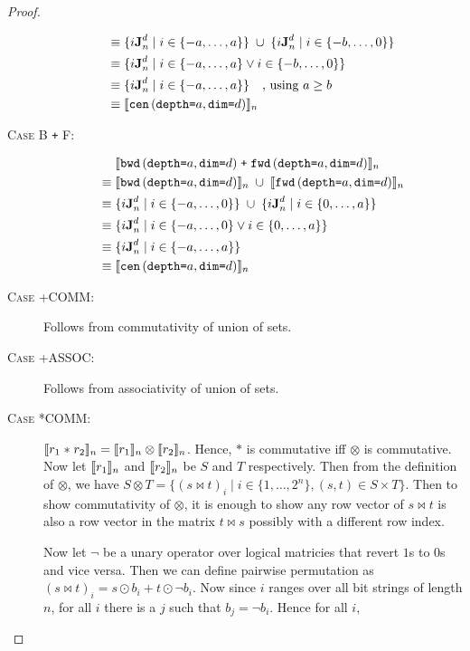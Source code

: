 \begin{proof}
\begin{description}
\begin{align*}
      \equiv & \; \{i\singleEntry{d}{n} \mid i \in \{-a, \ldots, a\} \} \; \cup \;
                  \{i\singleEntry{d}{n} \mid i \in \{-b, \ldots, 0\} \} \\
      \equiv & \; \{i\singleEntry{d}{n} \mid i \in \{-a, \ldots, a\}
                    \vee i \in \{-b, \ldots, 0\} \} \\
      \equiv & \; \{i\singleEntry{d}{n} \mid i \in \{-a, \ldots, a\} \} \quad \text{, using }a \geq b \\
      \equiv & \; \interp{\stenCenS{a}{d}}_n \\
    \end{align*}
  \item[\textsc{Case B \texttt{+} F}:]
    \begin{align*}
      & \; \interp{\stenBwdS{a}{d} \; \texttt{+} \; \stenFwdS{a}{d}}_{n} \\
      \equiv & \; \interp{\stenBwdS{a}{d}}_{n} \; \cup \; \interp{\stenFwdS{a}{d}}_{n} \\
      \equiv & \; \{i\singleEntry{d}{n} \mid i \in \{-a, \ldots, 0\} \} \; \cup \;
                  \{i\singleEntry{d}{n} \mid i \in \{0, \ldots, a\} \} \\
      \equiv & \; \{i\singleEntry{d}{n} \mid i \in \{-a, \ldots, 0\}
                    \vee i \in \{0, \ldots, a\} \} \\
      \equiv & \; \{i\singleEntry{d}{n} \mid i \in \{-a, \ldots, a\} \} \\
      \equiv & \; \interp{\stenCenS{a}{d}}_n \\
    \end{align*}
  \item[\textsc{Case +COMM}:] Follows from commutativity of union of sets.
  \item[\textsc{Case +ASSOC}:] Follows from associativity of union of sets.
  \item[\textsc{Case *COMM}:] $\interp{r_1 \; \texttt{$\ast$} \; r_2}_n =
    \interp{r_1}_n \otimes \interp{r_2}_n$. Hence, $\texttt{$\ast$}$ is
    commutative iff $\otimes$ is commutative. Now let $\interp{r_1}_n$ and
    $\interp{r_2}_n$ be $S$ and $T$ respectively. Then from the definition of
    $\otimes$, we have $S \otimes T = \{ (s \bowtie t)_i \mid i \in
    \{ 1, \ldots, 2^n \}, (s,t) \in S \times T \}$. Then to show
    commutativity of $\otimes$, it is enough to show any row vector of $s
    \bowtie t$ is also a row vector in the matrix $t \bowtie s$ possibly with a
    different row index.

    Now let $\neg$ be a unary operator over logical matricies that revert $1$s
    to $0$s and vice versa. Then we can define pairwise permutation as
    $(s \bowtie t)_i = s \odot b_i + t \odot \neg b_i$. Now since $i$ ranges
    over all bit strings of length $n$, for all $i$ there is a $j$ such that
    $b_j = \neg b_i$. Hence for all $i$,


\end{description}
\end{proof}
